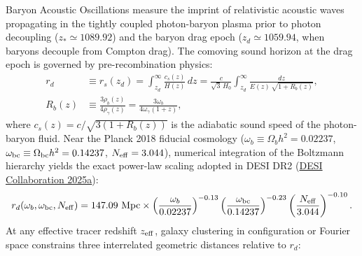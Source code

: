 \documentclass[aps,prd,preprint,superscriptaddress,nofootinbib]{revtex4-2}
\begin{document}
Baryon Acoustic Oscillations measure the imprint of relativistic acoustic waves propagating in the tightly coupled photon-baryon plasma prior to photon decoupling ($z_* \simeq 1089.92$) and the baryon drag epoch ($z_d \simeq 1059.94$, when baryons decouple from Compton drag). The comoving sound horizon at the drag epoch is governed by pre-recombination physics:
\begin{equation}
    \begin{aligned}
    r_d &\equiv r_s(z_d) = \int_{z_d}^\infty \frac{c_s(z)}{H(z)}\, dz = \frac{c}{\sqrt{3}\, H_0} \int_{z_d}^\infty \frac{dz}{E(z)\, \sqrt{1 + R_b(z)}},\\[4pt]
    R_b(z) &\equiv \frac{3\rho_b(z)}{4\rho_\gamma(z)} = \frac{3\omega_b}{4\omega_\gamma (1+z)},
    \end{aligned}
    \label{m:eq:rd_integral}
\end{equation}
where $c_s(z) = c / \sqrt{3(1 + R_b(z))}$ is the adiabatic sound speed of the photon-baryon fluid. Near the Planck 2018 fiducial cosmology ($\omega_b \equiv \Omega_b h^2 = 0.02237$, $\omega_{\rm bc} \equiv \Omega_{\rm bc} h^2 = 0.14237$, $N_{\rm eff} = 3.044$), numerical integration of the Boltzmann hierarchy yields the exact power-law scaling adopted in DESI DR2 (\href{https://arxiv.org/abs/2503.14738}{DESI Collaboration 2025a}):
\begin{equation}
    r_d(\omega_b, \omega_{\rm bc}, N_{\rm eff}) = 147.09\text{ Mpc} \times \left(\frac{\omega_b}{0.02237}\right)^{-0.13} \left(\frac{\omega_{\rm bc}}{0.14237}\right)^{-0.23} \left(\frac{N_{\rm eff}}{3.044}\right)^{-0.10}.
    \label{m:eq:rd_scaling}
\end{equation}
At any effective tracer redshift $z_{\rm eff}$, galaxy clustering in configuration or Fourier space constrains three interrelated geometric distances relative to $r_d$:
\end{document}
